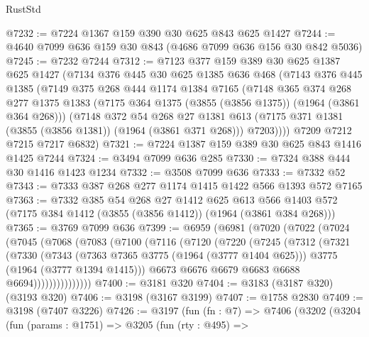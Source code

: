 \begin{lexlean}{RustStd}
\begin{coremodule}
@7232 := @7224 @1367 @159 @390 @30 @625 @843 @625 @1427
@7244 := @4640 @7099 @636 @159 @30 @843 (@4686 @7099 @636 @156 @30 @842 @5036)
@7245 := @7232 @7244
@7312 := @7123
    @377
    @159
    @389
    @30
    @625
    @1387
    @625
    @1427
    (@7134
      @376
      @445
      @30
      @625
      @1385
      @636
      @468
      (@7143
        @376
        @445
        @1385
        (@7149
          @375
          @268
          @444
          @1174
          @1384
          @7165
          (@7148
            @365
            @374
            @268
            @277
            @1375
            @1383
            (@7175 @364 @1375 (@3855 (@3856 @1375)) (@1964 (@3861 @364 @268)))
            (@7148
              @372
              @54
              @268
              @27
              @1381
              @613
              (@7175 @371 @1381 (@3855 (@3856 @1381)) (@1964 (@3861 @371 @268)))
              @7203))))
      @7209
      @7212
      @7215
      @7217
      @6832)
@7321 := @7224 @1387 @159 @389 @30 @625 @843 @1416 @1425 @7244
@7324 := @3494 @7099 @636 @285
@7330 := @7324 @388 @444 @30 @1416 @1423 @1234
@7332 := @3508 @7099 @636
@7333 := @7332 @52
@7343 := @7333 @387 @268 @277 @1174 @1415 @1422 @566 @1393 @572 @7165
@7363 := @7332
    @385
    @54
    @268
    @27
    @1412
    @625
    @613
    @566
    @1403
    @572
    (@7175 @384 @1412 (@3855 (@3856 @1412)) (@1964 (@3861 @384 @268)))
@7365 := @3769 @7099 @636
@7399 := @6959
    (@6981
      (@7020
        (@7022
          (@7024
            (@7045
              (@7068
                (@7083
                  (@7100
                    (@7116
                      (@7120
                        (@7220
                          (@7245
                            (@7312
                              (@7321
                                (@7330
                                  (@7343
                                    (@7363 @7365 @3775 (@1964 (@3777 @1404 @625)))
                                    @3775
                                    (@1964 (@3777 @1394 @1415)))
                                  @6673
                                  @6676
                                  @6679
                                  @6683
                                  @6688
                                  @6694)))))))))))))))
@7400 := @3181 @320
@7404 := @3183 (@3187 @320) (@3193 @320)
@7406 := @3198 (@3167 @3199)
@7407 := @1758 @2830
@7409 := @3198 (@7407 @3226)
@7426 := @3197
    (fun (fn : @7) =>
    @7406
      (@3202
        (@3204
          (fun (params : @1751) =>
          @3205
            (fun (rty : @495) =>

\end{coremodule}
\end{lexlean}
